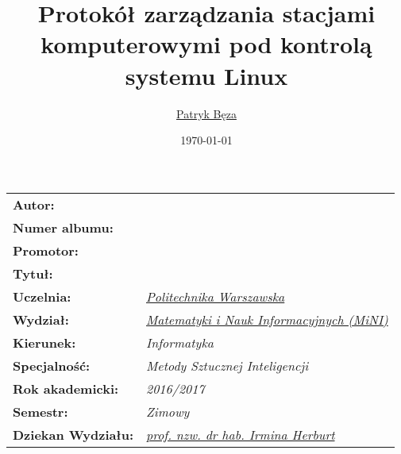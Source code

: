 \documentclass{mini}
\title{Protokół zarządzania stacjami komputerowymi pod kontrolą systemu Linux}
\author{\href{mailto:P.Beza@student.mini.pw.edu.pl}{Patryk Bęza}}
\date{\today}
\begin{document}
\maketitle
\makeatletter
{
	\renewcommand{\arraystretch}{2.5}
	\vspace*{\fill}
	\begin{table}[h]
	\centering
	\begin{tabular}{>{\bfseries}l>{\itshape}l}
		Autor:            & \@author\\
		Numer albumu:     & \@album\\
		Promotor:         & \@supervisor\\
		Tytuł:            & \parbox{6.5cm}{\@title}\\
		Uczelnia:         & \href{https://www.pw.edu.pl/}{Politechnika Warszawska}\\
		Wydział:          & \href{http://www.mini.pw.edu.pl/}{Matematyki i Nauk Informacyjnych (MiNI)}\\
		Kierunek:         & Informatyka\\
		Specjalność:      & Metody Sztucznej Inteligencji\\
		Rok akademicki:   & 2016/2017\\
		Semestr:          & Zimowy\\
		Dziekan Wydziału: & \href{mailto:I.Herburt@mini.pw.edu.pl}{prof. nzw. dr hab. Irmina Herburt}\\
	\end{tabular}
	\end{table}
	\vspace*{\fill}
}
\makeatother
\tableofcontents

\printglossary[style=clong,title=Słownik pojęć]

\setcounter{savepage}{\thepage}



\setcounter{page}{\thesavepage}


%
%

%
%
\printbibliography
\end{document}
